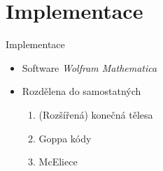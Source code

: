 \documentclass{beamer}
\begin{document}
\section{Implementace}

\begin{frame}{Implementace}

    \begin{itemize}
        \item Software \emph{Wolfram Mathematica}
        \item Rozdělena do samostatných 

            \begin{enumerate}
                \item (Rozšířená) konečná tělesa
                \item Goppa kódy
                \item McEliece
            \end{enumerate}
    \end{itemize}

\end{frame}

\end{document}
